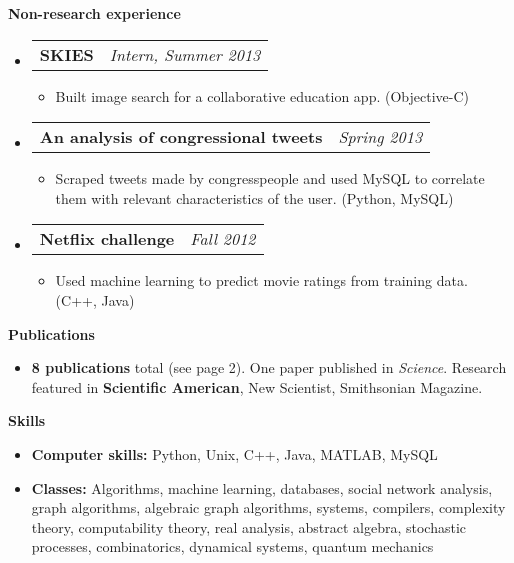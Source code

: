 \documentclass[letterpaper,10pt]{article}
\makeatletter
\newcommand{\resitem}[1]{\item #1 \vspace{-2pt}}
\newcommand{\resheading}[1]{{\large \colorbox{mygrey}{\begin{minipage}{\textwidth}{\textbf{#1 \vphantom{p\^{E}}}}\end{minipage}}}}
\newcommand{\ressubheading}[4]{
\begin{tabular*}{7.0in}{l@{\extracolsep{\fill}}r}
		\textbf{#1} & \textit{#4} \\
\end{tabular*}\vspace{-6pt}}
\makeatother
\begin{document}
\begin{itemize}

\end{itemize}

\resheading{Non-research experience}
\begin{itemize}
\item
	\ressubheading{SKIES}{Pasadena, CA}{Intern}{Intern, Summer 2013}
	\begin{itemize}
		\resitem{Built image search for a collaborative education app.  (Objective-C)}
	\end{itemize}

\item
	\ressubheading{An analysis of congressional tweets}{Pasadena, CA}{Student}{Spring 2013}
	\begin{itemize}
		\resitem{Scraped tweets made by congresspeople and used MySQL to correlate them with relevant characteristics of the user.  (Python, MySQL)}
	\end{itemize}
\item
	\ressubheading{Netflix challenge}{Pasadena, CA}{Student}{Fall 2012}
	\begin{itemize}
		\resitem{Used machine learning to predict movie ratings from training data.  (C++, Java)}
	\end{itemize}
\end{itemize}

\resheading{Publications}
\begin{itemize}
	\item {\bf 8 publications} total (see page 2).  One paper published in \emph{Science}.  Research featured in {\bf Scientific American}, New Scientist, Smithsonian Magazine.
\end{itemize}

\resheading{Skills}
\begin{itemize}
\item \textbf{Computer skills:} Python, Unix, C++, Java, MATLAB, MySQL
\item \textbf{Classes:} Algorithms, machine learning, databases, social network analysis, graph algorithms, algebraic graph algorithms, systems, compilers, complexity theory, computability theory, real analysis, abstract algebra, stochastic processes, combinatorics, dynamical systems, quantum mechanics
\end{itemize}
\end{document}
